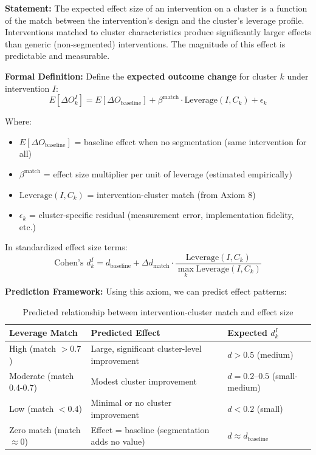 \begin{tcolorbox}[colback=blue!5!white, colframe=blue!75!black,
    title=Axiom SEG-MATCH-9: Specificity-Matching Principle]

\textbf{Statement:}
The expected effect size of an intervention on a cluster is a function of the match between
the intervention's design and the cluster's leverage profile. Interventions matched to cluster
characteristics produce significantly larger effects than generic (non-segmented) interventions.
The magnitude of this effect is predictable and measurable.

\textbf{Formal Definition:}
Define the \textbf{expected outcome change} for cluster $k$ under intervention $I$:
\begin{equation}
E[\Delta O_k^I] = E[\Delta O_{\text{baseline}}] + \beta^{\text{match}} \cdot \text{Leverage}(I, C_k) + \epsilon_k
\end{equation}

Where:
\begin{itemize}[nosep]
\item $E[\Delta O_{\text{baseline}}]$ = baseline effect when no segmentation (same intervention for all)
\item $\beta^{\text{match}}$ = effect size multiplier per unit of leverage (estimated empirically)
\item $\text{Leverage}(I, C_k)$ = intervention-cluster match (from Axiom 8)
\item $\epsilon_k$ = cluster-specific residual (measurement error, implementation fidelity, etc.)
\end{itemize}

In standardized effect size terms:
\begin{equation}
\text{Cohen's } d_k^I = d_{\text{baseline}} + \Delta d_{\text{match}} \cdot \frac{\text{Leverage}(I, C_k)}{\max_k \text{Leverage}(I, C_k)}
\end{equation}

\textbf{Prediction Framework:}
Using this axiom, we can predict effect patterns:

\begin{table}[h]
\centering
\small
\begin{tabular}{lll}
\toprule
\textbf{Leverage Match} & \textbf{Predicted Effect} & \textbf{Expected $d_k^I$} \\
\midrule
High (match $> 0.7$) & Large, significant cluster-level improvement & $d > 0.5$ (medium) \\
Moderate (match 0.4-0.7) & Modest cluster improvement & $d = 0.2$--$0.5$ (small-medium) \\
Low (match $< 0.4$) & Minimal or no cluster improvement & $d < 0.2$ (small) \\
Zero match (match $\approx 0$) & Effect = baseline (segmentation adds no value) & $d \approx d_{\text{baseline}}$ \\
\bottomrule
\end{tabular}
\caption{Predicted relationship between intervention-cluster match and effect size}
\label{tab:match-effect-sizes}
\end{table}


\end{tcolorbox}
